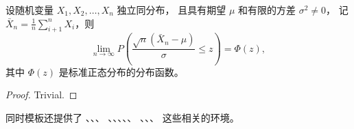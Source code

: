 \begin{theorem}
  设随机变量 $X_1, X_2, \dots, X_n$ 独立同分布， 且具有期望 $\mu$ 和有限的方差 $\sigma^2 \ne 0$，
  记 $\bar{X}_n = \frac{1}{n} \sum_{i+1}^n X_i$，则
  \begin{equation}
    \lim_{n \to \infty} P \left(\frac{\sqrt{n} \left( \bar{X}_n - \mu \right)}{\sigma} \le z \right) = \Phi(z),
  \end{equation}
  其中 $\Phi(z)$ 是标准正态分布的分布函数。
\end{theorem}
\begin{proof}
  Trivial.
\end{proof}

同时模板还提供了 、、、
、、、、、
、、、 这些相关的环境。
\fi
